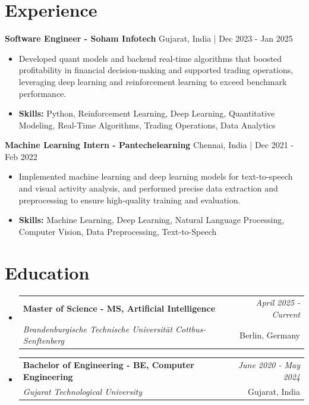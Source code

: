 \documentclass[a4paper,11pt]{article}
\makeatletter
\newcommand{\resumeSubheading}[4]{
\vspace{0.5mm}\item
    \begin{tabular*}{0.98\textwidth}[t]{l@{\extracolsep{\fill}}r}
        \textbf{#1} & \textit{\footnotesize{#4}} \\
        \textit{\footnotesize{#3}} &  \footnotesize{#2}\\
    \end{tabular*}
    \vspace{-2.4mm}
}
\makeatother
\begin{document}
\section{\textbf{Experience}}


\vspace{1mm}
  \textbf{Software Engineer - Soham Infotech} \hfill Gujarat, India | Dec 2023 - Jan 2025
\vspace{-1.5mm} %
\begin{itemize}
  \item Developed quant models and backend real-time algorithms that boosted profitability in financial decision-making and supported trading operations, leveraging deep learning and reinforcement learning to exceed benchmark performance.

\vspace{-2mm}
  \item \textbf{Skills:} Python, Reinforcement Learning, Deep Learning, Quantitative Modeling, Real-Time Algorithms, Trading Operations, Data Analytics
\end{itemize}

\vspace{1mm}
  \textbf{Machine Learning Intern - Pantechelearning} \hfill Chennai, India | Dec 2021 - Feb 2022
\vspace{-1.5mm} %
\begin{itemize}
  \item Implemented machine learning and deep learning models for text-to-speech and visual activity analysis, and performed precise data extraction and preprocessing to ensure high-quality training and evaluation.
\vspace{-2mm}
  \item \textbf{Skills:} Machine Learning, Deep Learning, Natural Language Processing, Computer Vision, Data Preprocessing, Text-to-Speech
\end{itemize}\section{\textbf{Education}}
\vspace{-0.4mm}

\begin{itemize}
\resumeSubheading
{Master of Science - MS, Artificial Intelligence }{Berlin, Germany}
{Brandenburgische Technische Universität Cottbus-Senftenberg  }{April 2025 - Current}

\vspace{1.0mm} %
\resumeSubheading
{Bachelor of Engineering - BE, Computer Engineering  }{Gujarat, India}
{Gujarat Technological University }{June 2020 - May 2024}

\end{itemize}
\end{document}
